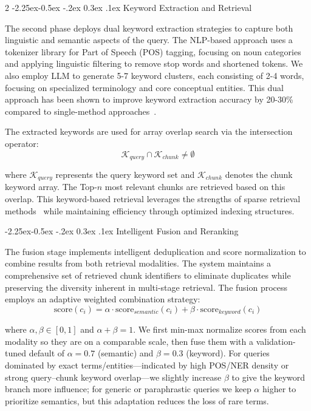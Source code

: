 \documentclass[10pt,letterpaper]{article}
\makeatletter
\let\cite\citep
\renewcommand{\subsubsection}{\@startsection{subsubsection}{3}{\z@}%
                                     {-2.25ex\@plus -0.5ex \@minus -.2ex}%
                                     {0.3ex \@plus .1ex}%
                                     {\normalfont\normalsize\itshape}}
\makeatother
\begin{document}
\begin{multicols}{2}
\subsubsection{Keyword Extraction and Retrieval}

The second phase deploys dual keyword extraction strategies to capture both linguistic and semantic aspects of the query. The NLP-based approach uses a tokenizer library for Part of Speech (POS) tagging, focusing on noun categories and applying linguistic filtering to remove stop words and shortened tokens. We also employ LLM to generate 5-7 keyword clusters, each consisting of 2-4 words, focusing on specialized terminology and core conceptual entities. This dual approach has been shown to improve keyword extraction accuracy by 20-30\% compared to single-method approaches~\cite{gao2021retrieval}.

The extracted keywords are used for array overlap search via the intersection operator:
\begin{equation}
\mathcal{K}_{query} \cap \mathcal{K}_{chunk} \neq \emptyset
\end{equation}

where $\mathcal{K}_{query}$ represents the query keyword set and $\mathcal{K}_{chunk}$ denotes the chunk keyword array. The Top-$n$ most relevant chunks are retrieved based on this overlap. This keyword-based retrieval leverages the strengths of sparse retrieval methods~\cite{robertson2009bm25,formal2021splade} while maintaining efficiency through optimized indexing structures.

\subsubsection{Intelligent Fusion and Reranking}

The fusion stage implements intelligent deduplication and score normalization to combine results from both retrieval modalities. The system maintains a comprehensive set of retrieved chunk identifiers to eliminate duplicates while preserving the diversity inherent in multi-stage retrieval. The fusion process employs an adaptive weighted combination strategy:
\begin{equation}
\text{score}(c_i) = \alpha \cdot \text{score}_{semantic}(c_i) + \beta \cdot \text{score}_{keyword}(c_i)
\end{equation}

where $\alpha,\beta\in[0,1]$ and $\alpha+\beta=1$. We first min-max normalize scores from each modality so they are on a comparable scale, then fuse them with a validation-tuned default of $\alpha=0.7$ (semantic) and $\beta=0.3$ (keyword). For queries dominated by exact terms/entities—indicated by high POS/NER density or strong query–chunk keyword overlap—we slightly increase $\beta$ to give the keyword branch more influence; for generic or paraphrastic queries we keep $\alpha$ higher to prioritize semantics, but this adaptation reduces the loss of rare terms.


\end{multicols}
\end{document}
